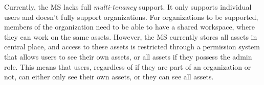 

Currently, the MS lacks full \textit{multi-tenancy} support.
It only supports individual users and doesn't fully support organizations.
For organizations to be supported, members of the organization need to be able to have a
shared workspace, where they can work on the same assets.
However, the MS currently stores all assets in central place,
and access to these assets is restricted through a permission system that allows users to see
their own assets, or all assets if they possess the admin role.
This means that users, regardless of if they are part of an organization or not,
can either only see their own assets,  or they can see all assets.



